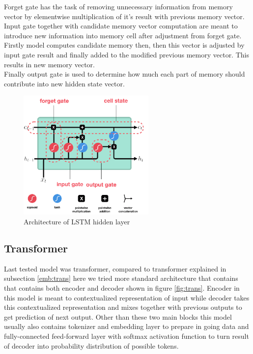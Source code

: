Forget gate has the task of removing unnecessary information from memory vector by elementwise multiplication of it's result with previous memory vector. 
\\

Input gate together with candidate memory vector computation are meant to introduce new information into memory cell after adjustment from forget gate. Firstly model computes candidate memory then, then this vector is adjusted by input gate result and finally added to the modified previous memory vector. This results in new memory vector.
\\

Finally output gate is used to determine how much each part of memory should contribute into new hidden state vector.

 
\begin{figure}[!h]
	\centering
 	
	\includegraphics[width=0.6\textwidth]{images/LSTM_arch.png}
 	
 	\caption{Architecture of LSTM hidden layer}
 	\label{fig:lstm_arch}
\end{figure}

\subsection{Transformer}

Last tested model was transformer, compared to transformer explained in subsection \ref{emb:trans} here we tried more standard architecture that contains that contains both encoder and decoder shown in figure \ref{fig:trans}. Encoder in this model is meant to contextualized representation of input while decoder takes this contextualized representation and mixes together with previous outputs to get prediction of next output. Other than these two main blocks this model usually also contains tokenizer and embedding layer to prepare in going data and fully-connected feed-forward layer with softmax activation function to turn result of decoder into probability distribution of possible tokens.  
\\

